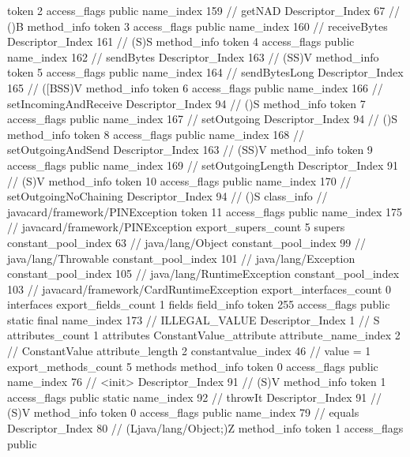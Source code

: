 {{{{{					token	2
					access_flags	public
					name_index	159		// getNAD
					Descriptor_Index	67		// ()B
				}
				method_info {
					token	3
					access_flags	public
					name_index	160		// receiveBytes
					Descriptor_Index	161		// (S)S
				}
				method_info {
					token	4
					access_flags	public
					name_index	162		// sendBytes
					Descriptor_Index	163		// (SS)V
				}
				method_info {
					token	5
					access_flags	public
					name_index	164		// sendBytesLong
					Descriptor_Index	165		// ([BSS)V
				}
				method_info {
					token	6
					access_flags	public
					name_index	166		// setIncomingAndReceive
					Descriptor_Index	94		// ()S
				}
				method_info {
					token	7
					access_flags	public
					name_index	167		// setOutgoing
					Descriptor_Index	94		// ()S
				}
				method_info {
					token	8
					access_flags	public
					name_index	168		// setOutgoingAndSend
					Descriptor_Index	163		// (SS)V
				}
				method_info {
					token	9
					access_flags	public
					name_index	169		// setOutgoingLength
					Descriptor_Index	91		// (S)V
				}
				method_info {
					token	10
					access_flags	public
					name_index	170		// setOutgoingNoChaining
					Descriptor_Index	94		// ()S
				}
			}
		}
		class_info {		// javacard/framework/PINException
			token	11
			access_flags	public
			name_index	175		// javacard/framework/PINException
			export_supers_count	5
			supers {
				constant_pool_index	63		// java/lang/Object
				constant_pool_index	99		// java/lang/Throwable
				constant_pool_index	101		// java/lang/Exception
				constant_pool_index	105		// java/lang/RuntimeException
				constant_pool_index	103		// javacard/framework/CardRuntimeException
			}
			export_interfaces_count	0
			interfaces {
			}
			export_fields_count	1
			fields {
			field_info {
				token	255
				access_flags	public static final
				name_index	173		// ILLEGAL_VALUE
				Descriptor_Index	1		// S
				attributes_count	1
				attributes {
				ConstantValue_attribute {
					attribute_name_index	2		// ConstantValue
					attribute_length	2
					constantvalue_index	46		// value = 1
				}
				}
			}
			}
			export_methods_count	5
			methods {
				method_info {
					token	0
					access_flags	public
					name_index	76		// <init>
					Descriptor_Index	91		// (S)V
				}
				method_info {
					token	1
					access_flags	public static
					name_index	92		// throwIt
					Descriptor_Index	91		// (S)V
				}
				method_info {
					token	0
					access_flags	public
					name_index	79		// equals
					Descriptor_Index	80		// (Ljava/lang/Object;)Z
				}
				method_info {
					token	1
					access_flags	public
}}}}}
